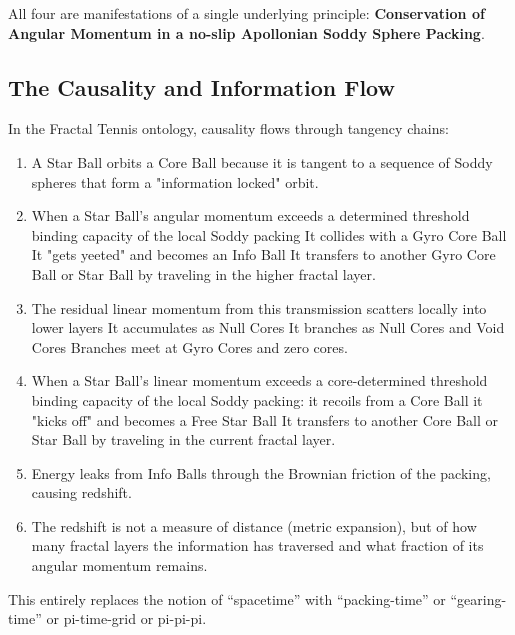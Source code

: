 \documentclass[11pt,a4paper]{article}
\begin{document}
    All four are manifestations of a single underlying principle: \textbf{Conservation of Angular Momentum in a no-slip Apollonian Soddy Sphere Packing}.

    \subsection{The Causality and Information Flow}

    In the Fractal Tennis ontology, causality flows through tangency chains:

    \begin{enumerate}

    \item A Star Ball orbits a Core Ball because it is tangent to a sequence of Soddy spheres that form a "information locked" orbit.

    \item When a Star Ball's angular momentum exceeds a determined threshold binding capacity of the local Soddy packing
    \subitem It collides with a Gyro Core Ball
    \subitem It "gets yeeted" and becomes an Info Ball
    \subitem It transfers to another Gyro Core Ball or Star Ball by traveling in the higher fractal layer.

    \item The residual linear momentum from this transmission scatters locally into lower layers
    \subitem It accumulates as Null Cores 
    \subitem It branches as Null Cores and Void Cores 
    \subitem Branches meet at Gyro Cores and zero cores.

    \item When a Star Ball's linear momentum exceeds a core-determined threshold binding capacity of the local Soddy packing:
    \subitem it recoils from a Core Ball
    \subitem it "kicks off" and becomes a Free Star Ball
    \subitem It transfers to another Core Ball or Star Ball by traveling in the current fractal layer.

    \item Energy leaks from Info Balls through the Brownian friction of the packing, causing redshift.
    \item The redshift is not a measure of distance (metric expansion), but of how many fractal layers the information has traversed and what fraction of its angular momentum remains.

    \end{enumerate}

    This entirely replaces the notion of ``spacetime'' with ``packing-time'' or ``gearing-time'' or pi-time-grid or pi-pi-pi.
\end{document}
